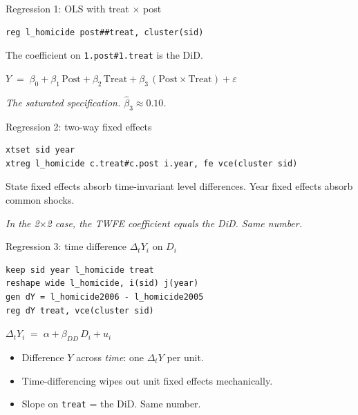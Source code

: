 \documentclass[aspectratio=169,11pt]{beamer}
\begin{document}
\begin{frame}[fragile]{Regression 1: OLS with treat $\times$ post}
\vspace{0.4em}
\begin{lstlisting}[language={[ANSI]C}]
reg l_homicide post##treat, cluster(sid)
\end{lstlisting}
\vspace{0.8em}
The coefficient on \texttt{1.post\#1.treat} is the DiD.
\vspace{0.6em}
\begin{center}
$Y \;=\; \beta_0 + \beta_1\,\text{Post} + \beta_2\,\text{Treat} + \beta_3\,(\text{Post}\times\text{Treat}) + \varepsilon$
\end{center}
\vspace{0.4em}
\begin{center}
\small\color{warmgray}\itshape The saturated specification. $\hat\beta_3 \approx 0.10$.
\end{center}
\end{frame}

\begin{frame}[fragile]{Regression 2: two-way fixed effects}
\vspace{0.4em}
\begin{lstlisting}[language={[ANSI]C}]
xtset sid year
xtreg l_homicide c.treat#c.post i.year, fe vce(cluster sid)
\end{lstlisting}
\vspace{0.8em}
State fixed effects absorb time-invariant level differences. \;Year fixed effects absorb common shocks.
\vspace{0.4em}
\begin{center}
\small\color{warmgray}\itshape In the 2$\times$2 case, the TWFE coefficient equals the DiD. \;Same number.
\end{center}
\end{frame}

\begin{frame}[fragile]{Regression 3: time difference $\Delta_t Y_i$ on $D_i$}
\vspace{0.3em}
\begin{lstlisting}[language={[ANSI]C}]
keep sid year l_homicide treat
reshape wide l_homicide, i(sid) j(year)
gen dY = l_homicide2006 - l_homicide2005
reg dY treat, vce(cluster sid)
\end{lstlisting}
\vspace{0.6em}
\begin{center}
$\Delta_t Y_i \;=\; \alpha + \beta_{DD}\,D_i + u_i$
\end{center}
\vspace{0.4em}
\begin{itemize}\small
  \item Difference $Y$ across \textit{time}: one $\Delta_t Y$ per unit.
  \item Time-differencing wipes out unit fixed effects mechanically.
  \item Slope on \texttt{treat} = the DiD. \;Same number.
\end{itemize}
\end{frame}
\end{document}
